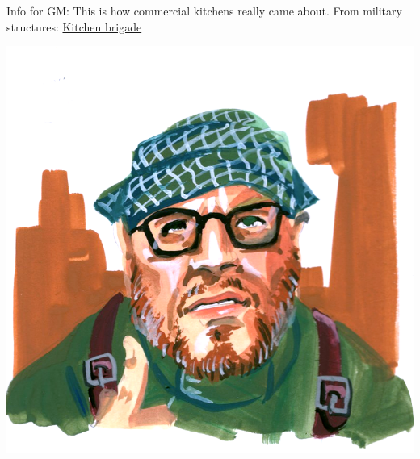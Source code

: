 Info for GM: This is how commercial kitchens really came about. From military structures: \href{https://en.wikipedia.org/wiki/Kitchen_brigade}{Kitchen brigade}

\begin{center}
    \includegraphics[scale=0.4]{portraits/Flohmarkt_Gustav.png}
\end{center}

